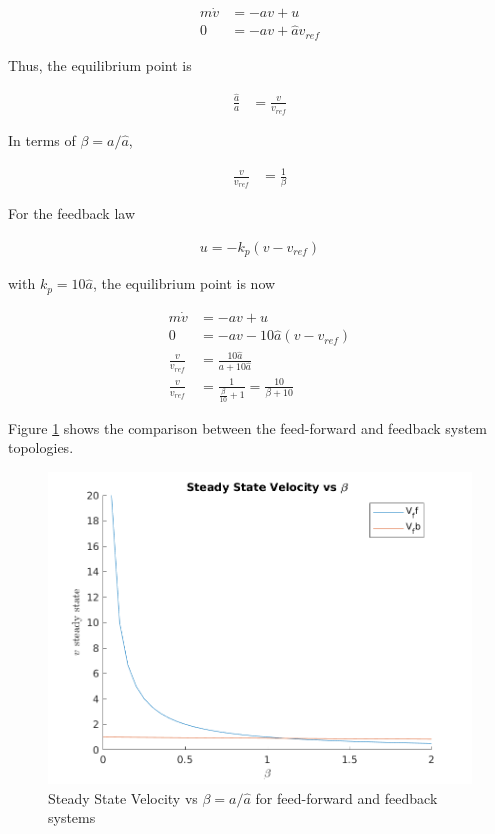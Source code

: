 \documentclass[11pt]{article}
\theoremstyle{definition}
\begin{document}
\begin{enumerate}
\begin{enumerate}
        \begin{align*}
            m\dot{v} &= -av + u\\
            0 &= -av + \hat{a}v_{ref}
        \end{align*}
        
        Thus, the equilibrium point is 
        
        \begin{align*}
            \frac{\hat{a}}{a} &= \frac{v}{v_{ref}}
        \end{align*}
        
        In terms of $\beta = a/\hat{a}$,
         
        \begin{align*}
            \frac{v}{v_{ref}} &= \frac{1}{\beta}
        \end{align*}
        
        For the feedback law
        
        \begin{align*}
        u = -k_p(v - v_{ref})
        \end{align*}
        
        with $k_p = 10\hat{a}$, the equilibrium point is now
        
        \begin{align*}
            m\dot{v} &= -av + u\\
            0 &= -av - 10\hat{a}(v - v_{ref})\\
            \frac{v}{v_{ref}} &= \frac{10\hat{a}}{a + 10\hat{a}} \\
            \frac{v}{v_{ref}} &= \frac{1}{\frac{\beta}{10} + 1} = \frac{10}{\beta + 10}
        \end{align*}
        
        Figure \ref{fig:steadystates} shows the comparison between the feed-forward and feedback system topologies.
        
        \begin{figure}[h]
            \centering
            \includegraphics[width = 0.8 \textwidth]{ES155P1_4a_steadystatevsbeta.png}
            \caption{Steady State Velocity vs $\beta = a/\hat{a}$ for feed-forward and feedback systems}
            \label{fig:steadystates}
        \end{figure}


\end{enumerate}
\end{enumerate}
\end{document}

